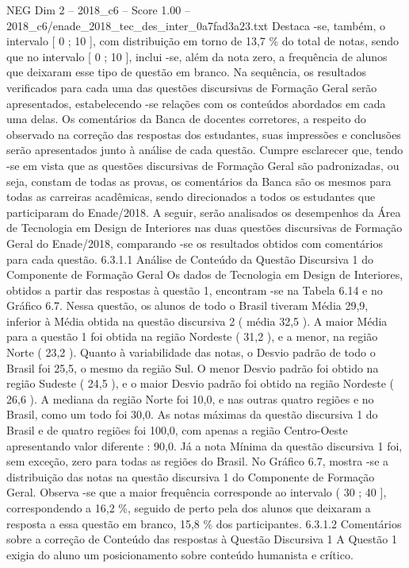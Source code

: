 \begin{textsample}{NEG Dim 2 – 2018\_c6 – Score 1.00 – 2018\_c6/enade\_2018\_tec\_des\_inter\_0a7fad3a23.txt}
Destaca -se, também, o intervalo [ 0 ; 10 ], com distribuição em torno de 13,7 \% do total de notas, sendo que no intervalo [ 0 ; 10 ], inclui -se, além da nota zero, a frequência de alunos que deixaram esse tipo de questão em branco.
Na sequência, os resultados verificados para cada uma das questões discursivas de Formação Geral serão apresentados, estabelecendo -se relações com os conteúdos abordados em cada uma delas.
Os comentários da Banca de docentes corretores, a respeito do observado na correção das respostas dos estudantes, suas impressões e conclusões serão apresentados junto à análise de cada questão.
Cumpre esclarecer que, tendo -se em vista que as questões discursivas de Formação Geral são padronizadas, ou seja, constam de todas as provas, os comentários da Banca são os mesmos para todas as carreiras acadêmicas, sendo direcionados a todos os estudantes que participaram do Enade/2018.
A seguir, serão analisados os desempenhos da Área de Tecnologia em Design de Interiores nas duas questões discursivas de Formação Geral do Enade/2018, comparando -se os resultados obtidos com comentários para cada questão. 6.3.1.1 Análise de Conteúdo da Questão Discursiva 1 do Componente de Formação Geral Os dados de Tecnologia em Design de Interiores, obtidos a partir das respostas à questão 1, encontram -se na Tabela 6.14 e no Gráfico 6.7.
Nessa questão, os alunos de todo o Brasil tiveram Média 29,9, inferior à Média obtida na questão discursiva 2 ( média 32,5 ).
A maior Média para a questão 1 foi obtida na região Nordeste ( 31,2 ), e a menor, na região Norte ( 23,2 ).
Quanto à variabilidade das notas, o Desvio padrão de todo o Brasil foi 25,5, o mesmo da região Sul.
O menor Desvio padrão foi obtido na região Sudeste ( 24,5 ), e o maior Desvio padrão foi obtido na região Nordeste ( 26,6 ).
A mediana da região Norte foi 10,0, e nas outras quatro regiões e no Brasil, como um todo foi 30,0.
As notas máximas da questão discursiva 1 do Brasil e de quatro regiões foi 100,0, com apenas a região Centro-Oeste apresentando valor diferente : 90,0.
Já a nota Mínima da questão discursiva 1 foi, sem exceção, zero para todas as regiões do Brasil.
No Gráfico 6.7, mostra -se a distribuição das notas na questão discursiva 1 do Componente de Formação Geral.
Observa -se que a maior frequência corresponde ao intervalo ( 30 ; 40 ], correspondendo a 16,2 \%, seguido de perto pela dos alunos que deixaram a resposta a essa questão em branco, 15,8 \% dos participantes. 6.3.1.2 Comentários sobre a correção de Conteúdo das respostas à Questão Discursiva 1 A Questão 1 exigia do aluno um posicionamento sobre conteúdo humanista e crítico.

\end{textsample}
